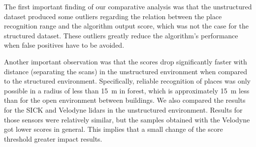 The first important finding of our comparative analysis was that the unstructured dataset produced some outliers regarding the relation between the place recognition range and the algorithm output score, which was not the case for the structured dataset. These outliers greatly reduce the algorithm's performance when false positives have to be avoided.

Another important observation was that the scores drop significantly faster with distance (separating the scans) in the unstructured environment when compared to the structured environment. Specifically, reliable recognition of places was only possible in a radius of less than \SI{15}{\meter} in forest, which is approximately \SI{15}{\meter} less than for the open environment between buildings. We also compared the results for the SICK and Velodyne \gls*{lidar}s in the unstructured environment. Results for those sensors were relatively similar, but the samples obtained with the Velodyne got lower scores in general. This implies that a small change of the score threshold greater impact results. 

